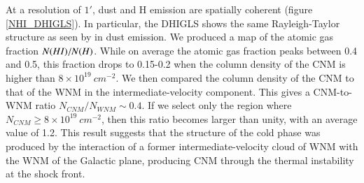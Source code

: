 \documentclass[traditabstract]{aa}
\begin{document}
   At a resolution of $1'$, dust and H emission are spatially coherent (figure \ref{NHI_DHIGLS}). In particular, the DHIGLS shows the same Rayleigh-Taylor structure as seen by \cite{MAMD_2017b} in dust emission. We produced a map of the atomic gas fraction $N(H\rmnum{1})/N(H)$. While on average the atomic gas fraction peaks between 0.4 and 0.5, this fraction drops to 0.15-0.2 when the column density of the CNM is higher than $8\times 10^{19}\: cm^{-2}$.
We then compared the column density of the CNM to that of the WNM in the intermediate-velocity component. This gives a CNM-to-WNM ratio $N_{CNM}/N_{WNM}\sim 0.4$. If we select only the region where $N_{CNM}\geq 8\times 10^{19}\: cm^{-2}$, then this ratio becomes larger than unity, with an average value of 1.2.
This result suggests that the structure of the cold phase was produced by the interaction of a former intermediate-velocity cloud of WNM with the WNM of the Galactic plane, producing CNM through the thermal instability at the shock front.
\end{document}
